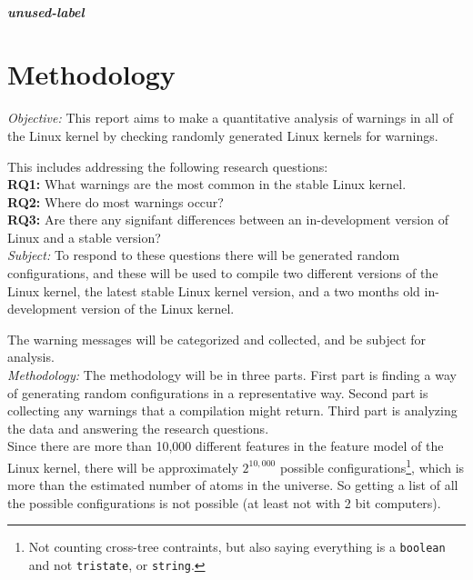 \documentclass[a4paper,11pt]{report}
\newcommand{\f}{\footnote{\fn}}
\begin{document}
            \paragraph{unused-label}

\newpage
\chapter{Methodology}

\emph{Objective:}
This report aims to make a quantitative analysis of warnings in all of the
Linux kernel by checking randomly generated Linux kernels for warnings.

This includes addressing the following research questions:
\\

\textbf{RQ1:} What warnings are the most common in the stable Linux kernel.
\\

\textbf{RQ2:} Where do most warnings occur?
\\

\textbf{RQ3:} Are there any signifant differences between an in-development 
version of Linux and a stable version?
\\

\emph{Subject:}
To respond to these questions there will be generated random configurations, 
and these will be used to compile two different versions of the Linux kernel, 
the latest stable Linux kernel version, and a two months old in-development 
version of the Linux kernel.

The warning messages will be categorized and collected, and be subject for 
analysis.
\\

\emph{Methodology:}
The methodology will be in three parts. First part is finding a way of
generating random configurations in a representative way. Second part is 
collecting any warnings that a compilation might return. Third part is 
analyzing the data and answering the research questions.
\\

        \def \fn{Not counting cross-tree contraints, but also saying 
        everything is a \texttt{boolean} and not \texttt{tristate}, or 
        \texttt{string}.}
Since there are more than 10,000 different features in the feature model of the
Linux kernel, there will be approximately $2^{10,000}$ possible 
configurations\f, which is more than the estimated number of atoms in the 
universe. So getting a list of all the possible configurations is not possible 
(at least not with 2 bit computers).
\end{document}
